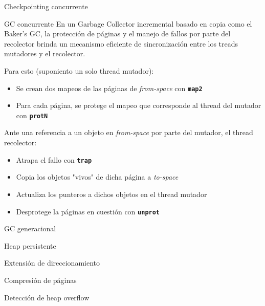 \documentclass[xcolor=pdftex,dvipsnames,usenames,table]{beamer}
\begin{document}
\begin{frame}{Checkpointing concurrente}
\end{frame}

\begin{frame}{GC concurrente}
\pause En un Garbage Collector incremental basado en copia como el Baker's GC, la protección de páginas y el manejo de fallos por parte del recolector brinda un mecanismo eficiente de sincronización entre los treads mutadores y el recolector.

\pause Para esto (suponiento un solo thread mutador):
	\pause
	\begin{itemize}
		\item Se crean dos mapeos de las páginas de \emph{from-space} con \textbf{\texttt{map2}}
		\item Para cada página, se protege el mapeo que corresponde al thread del mutador con \textbf{\texttt{protN}}
	\end{itemize}

\pause Ante una referencia a un objeto en \emph{from-space} por parte del mutador, el thread recolector:
	\pause
	\begin{itemize}
		\item Atrapa el fallo con \textbf{\texttt{trap}}
		\item Copia los objetos "vivos" de dicha página a \emph{to-space}
		\item Actualiza los punteros a dichos objetos en el thread mutador
		\item Desprotege la páginas en cuestión con \textbf{\texttt{unprot}}
	\end{itemize}

\end{frame}

\begin{frame}{GC generacional}
\end{frame}

\begin{frame}{Heap persistente}
\end{frame}

\begin{frame}{Extensión de direccionamiento}
\end{frame}

\begin{frame}{Compresión de páginas}
\end{frame}

\begin{frame}{Detección de heap overflow}
\end{frame}
\end{document}
